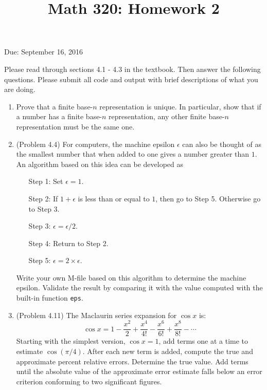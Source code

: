 \documentclass[12pt]{amsart}
\begin{document}
\title{Math 320: Homework 2}
Due: September 16, 2016
\maketitle

Please read through sections 4.1 - 4.3 in the textbook.
Then answer the following questions. Please submit all code
and output with brief descriptions of what you are doing.

\vspace{1cm}

\begin{enumerate}

\item Prove that a finite base-$n$ representation is unique.
In particular, show that if a number has a finite base-$n$ representation,
any other finite base-$n$ representation must be the same one.

\vspace{1cm}

\item (Problem 4.4) For computers, the machine epsilon
$\epsilon$ can also be thought of as the smallest number that
when added to one gives a number greater than $1$. An algorithm
based on this idea can be developed as
\begin{itemize}
\item[Step 1:] Set $\epsilon = 1$.
\item[Step 2:] If $1 + \epsilon$ is less than or equal to $1$, then
go to Step 5. Otherwise go to Step 3.
\item[Step 3:] $\epsilon = \epsilon/2$.
\item[Step 4:] Return to Step 2.
\item[Step 5:] $\epsilon = 2 \times \epsilon$.
\end{itemize}
Write your own M-file based on this algorithm to determine
the machine epsilon. Validate the result by comparing it with
the value computed with the built-in function {\tt eps}.

\vspace{1cm}

\item (Problem 4.11) The Maclaurin series expansion
for $\cos x$ is:
\[ \cos x = 1 - \dfrac{x^2}{2} + \dfrac{x^4}{4!} - \dfrac{x^6}{6!}
+ \dfrac{x^8}{8!} - \cdots \]
Starting with the simplest version, $\cos x = 1$, add terms one
at a time to estimate $\cos(\pi/4)$. After each new term is added,
compute the true and approximate percent relative errors.
Determine the true value. Add terms until the absolute value of
the approximate error estimate falls below an error criterion
conforming to two significant figures.

\end{enumerate}
\end{document}
